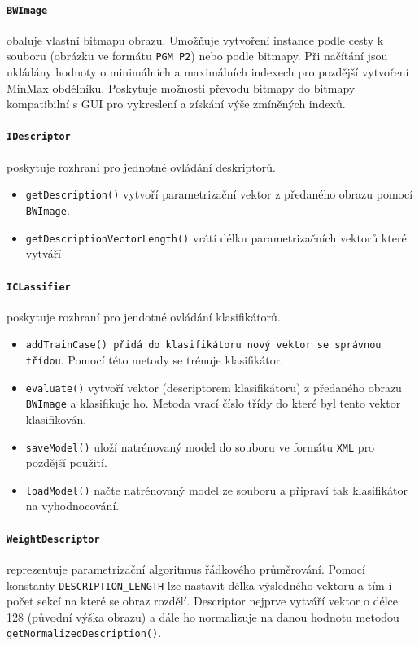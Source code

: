 \documentclass[12pt]{article}
\begin{document}
\paragraph{\texttt{BWImage}}
obaluje vlastní bitmapu obrazu. Umožňuje vytvoření instance podle cesty k souboru (obrázku ve formátu \texttt{PGM P2}) nebo podle bitmapy. Při načítání jsou ukládány hodnoty o minimálních a maximálních indexech pro pozdější vytvoření MinMax obdélníku. Poskytuje možnosti převodu bitmapy do bitmapy kompatibilní s GUI pro vykreslení a získání výše zmíněných indexů.

\paragraph{\texttt{IDescriptor}}
poskytuje rozhraní pro jednotné ovládání deskriptorů.
\begin{itemize}
\item \texttt{getDescription()} vytvoří parametrizační vektor z předaného obrazu pomocí \texttt{BWImage}.
\item \texttt{getDescriptionVectorLength()} vrátí délku parametrizačních vektorů které vytváří
\end{itemize} 

\paragraph{\texttt{ICLassifier}}
poskytuje rozhraní pro jendotné ovládání klasifikátorů.
\begin{itemize}
\item \texttt{addTrainCase() přidá do klasifikátoru nový vektor se správnou třídou}. Pomocí této metody se trénuje klasifikátor.
\item \texttt{evaluate()} vytvoří vektor (descriptorem klasifikátoru) z předaného obrazu \texttt{BWImage} a klasifikuje ho. Metoda vrací číslo třídy do které byl tento vektor klasifikován.
\item \texttt{saveModel()} uloží natrénovaný model do souboru ve formátu \texttt{XML} pro pozdější použití.
\item \texttt{loadModel()} načte natrénovaný model ze souboru a připraví tak klasifikátor na vyhodnocování.
\end{itemize}

\paragraph{\texttt{WeightDescriptor}}
reprezentuje parametrizační algoritmus řádkového průměrování. Pomocí konstanty \texttt{DESCRIPTION\_LENGTH} lze nastavit délka výsledného vektoru a tím i počet sekcí na které se obraz rozdělí. Descriptor nejprve vytváří vektor o délce 128 (původní výška obrazu) a dále ho normalizuje na danou hodnotu metodou \texttt{getNormalizedDescription()}.
\end{document}

